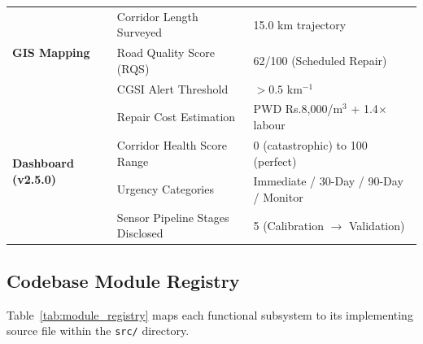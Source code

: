\begin{table}[htbp]
\begin{tabularx}{\textwidth}{lp{5.0cm}p{4.2cm}}
\midrule
\multirow{3}{*}{\textbf{GIS Mapping}} 
& Corridor Length Surveyed & 15.0 km trajectory \\
& Road Quality Score (RQS) & 62/100 (Scheduled Repair) \\
& CGSI Alert Threshold & $> 0.5$ km$^{-1}$ \\
\midrule
\multirow{4}{*}{\textbf{Dashboard (v2.5.0)}} 
& Repair Cost Estimation & PWD Rs.8,000/m$^3$ + 1.4$\times$ labour \\
& Corridor Health Score Range & 0 (catastrophic) to 100 (perfect) \\
& Urgency Categories & Immediate / 30-Day / 90-Day / Monitor \\
& Sensor Pipeline Stages Disclosed & 5 (Calibration $\to$ Validation) \\
\bottomrule
\end{tabularx}
\end{table}

\subsection{Codebase Module Registry}
Table~\ref{tab:module_registry} maps each functional subsystem to its implementing source file within the \texttt{src/} directory.

